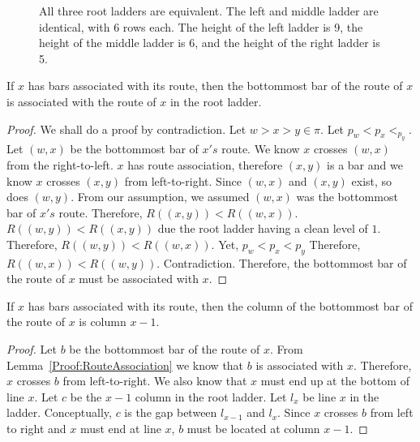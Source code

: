 \begin{figure}
\begin{minipage}{0.3\textwidth}
    \end{minipage}
      \caption{All three root ladders are equivalent. The left and middle ladder are identical, 
      with 6 rows each. The height of the left ladder is 9, the height of the middle ladder is 6, and the height of the right ladder is 5.}
      \label{Fig:RootLadderHeights}
\end{figure}


\begin{lemma}
    If $x$ has bars associated with its route, then the bottommost bar of the route of $x$ 
    is associated with the route of $x$ in the root ladder.
    \label{Proof:RouteAssociation}
\end{lemma}
\begin{proof}
    We shall do a proof by contradiction. Let $w>x>y \in \pi$. Let $p_{w}<p_{x}<_p_{y}$. Let $(w,x)$ be the bottommost bar of $x's$ route. 
    We know $x$ crosses $(w,x)$ from the right-to-left. 
    $x$ has route association, therefore $(x,y)$ is a bar and we 
    know $x$ crosses $(x,y)$ from left-to-right. 
    Since $(w,x)$ and $(x,y)$ exist, so does $(w,y)$. From our assumption, we assumed $(w,x)$ was the bottommost bar of 
    $x's$ route. Therefore, $R((x,y))<R((w,x))$. $R((w,y)) < R((x,y))$ due the root ladder having a clean level of $1$. 
    Therefore, $R((w,y))<R((w,x))$. Yet, $p_{w}<p_{x}<p_{y}$  Therefore, 
    $R((w,x))<R((w,y))$. Contradiction. Therefore, the bottommost bar of the route of $x$ must be associated with $x$. 
    
\end{proof}
\begin{corollary}
    If $x$ has bars associated with its route, then the column of the bottommost bar of the route of $x$ is column $x-1$.
    \label{Corollary:Column}
\end{corollary}
\begin{proof}
    Let $b$ be the bottommost bar of the route of $x$. From Lemma~\ref{Proof:RouteAssociation} we know that $b$ is associated 
    with $x$. Therefore, $x$ crosses $b$ from left-to-right. We also know that $x$ must end up at the bottom of line $x$. 
    Let $c$ be the $x-1$ column in the root ladder. Let $l_{x}$ be line $x$ in the ladder. Conceptually, $c$ is the gap between $l_{x-1}$ 
    and $l_{x}$. Since $x$ crosses $b$ from left to right and $x$ must end at line $x$, $b$ must be located at column $x-1$.    
\end{proof}
 

